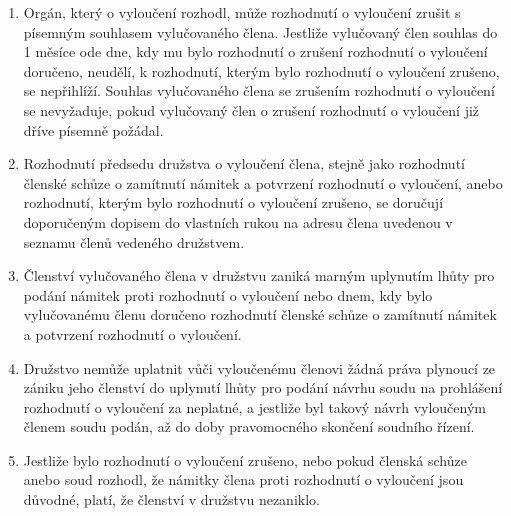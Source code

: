 \begin{enumerate}
    \item Orgán, který o vyloučení rozhodl, může rozhodnutí o vyloučení zrušit s písemným souhlasem vylučovaného člena. Jestliže vylučovaný člen souhlas do 1 měsíce ode dne, kdy mu bylo rozhodnutí o zrušení rozhodnutí o vyloučení doručeno, neudělí, k rozhodnutí, kterým bylo rozhodnutí o vyloučení zrušeno, se nepřihlíží. Souhlas vylučovaného člena se zrušením rozhodnutí o vyloučení se nevyžaduje, pokud vylučovaný člen o zrušení rozhodnutí o vyloučení již dříve písemně požádal.
    \item Rozhodnutí předsedu družstva o vyloučení člena, stejně jako rozhodnutí členské schůze o zamítnutí námitek a potvrzení rozhodnutí o vyloučení, anebo rozhodnutí, kterým bylo rozhodnutí o vyloučení zrušeno, se doručují doporučeným dopisem do vlastních rukou na adresu člena uvedenou v seznamu členů vedeného družstvem.
    \item Členství vylučovaného člena v družstvu zaniká marným uplynutím lhůty pro podání námitek proti rozhodnutí o vyloučení nebo dnem, kdy bylo vylučovanému členu doručeno rozhodnutí členské schůze o zamítnutí námitek a potvrzení rozhodnutí o vyloučení.
    \item Družstvo nemůže uplatnit vůči vyloučenému členovi žádná práva plynoucí ze zániku jeho členství do uplynutí lhůty pro podání návrhu soudu na prohlášení rozhodnutí o vyloučení za neplatné, a jestliže byl takový návrh vyloučeným členem soudu podán, až do doby pravomocného skončení soudního řízení.
    \item Jestliže bylo rozhodnutí o vyloučení zrušeno, nebo pokud členská schůze anebo soud rozhodl, že námitky člena proti rozhodnutí o vyloučení jsou důvodné, platí, že členství v družstvu nezaniklo.
\end{enumerate}

